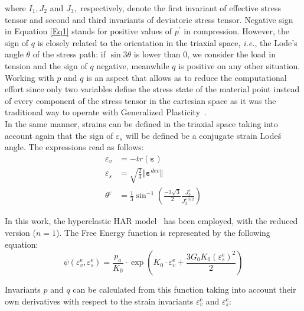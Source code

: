 \documentclass[preprint,12pt,a4paper]{elsarticle}
\begin{document}
where \(I_{1}, J_{2}\) and \(J_{3},\) respectively, denote the first invariant of effective stress tensor and second
and third invariants of deviatoric stress tensor. Negative sign in Equation \eqref{Eq1} stands for positive values of \(p^{\prime}\) in compression. However, the sign of $q$ is closely related to the orientation in the triaxial space, \textit{i.e.}, the Lode's angle $\theta$ of the stress path: if $\sin 3\theta$ is lower than 0, we consider the load in tension and the sign of $q$ negative, meanwhile $q$ is positive on any other situation. Working with $p$ and $q$ is an aspect that allows as to reduce the computational effort since only two variables define the stress state of the material point instead of every component of the stress tensor in the cartesian space as it was the traditional way to operate with Generalized Plasticity~\cite{Mira2009}.\\

In the same manner, strains can be defined in the triaxial space taking into account again that the sign of $\varepsilon_s$ will be defined be a conjugate strain Lode\'s angle. The expressions read as follows:
\begin{eqnarray}
\varepsilon_v &=- tr(\boldsymbol{\varepsilon})\label{Eq4}\\ 
\varepsilon_s &=\sqrt{\frac{2}{3}}\Vert \boldsymbol{\varepsilon}^{dev} \Vert \label{Eq5}\\ 
\theta^{\varepsilon} &=\frac{1}{3} \sin ^{-1}\left(\frac{-3 \sqrt{3}}{2} \frac{J^{\varepsilon}_{3}}{J_{2}^{\varepsilon \,3 / 2}}\right)\label{Eq6}
\end{eqnarray}

In this work, the hyperelastic HAR model~\cite{Houlsby2005} has been employed, with the reduced version ($n=1$). The Free Energy function is represented by the following equation:
\begin{equation}
\psi\left(\varepsilon_{v}^{\mathrm{e}}, \varepsilon_{s}^{\mathrm{e}}\right)=\frac{p_{a}}{K_0} \cdot \exp \left(K_0 \cdot \varepsilon_{v}^{\mathrm{e}}+\frac{3 G_0 K_0\left(\varepsilon_{s}^{\mathrm{e}}\right)^{2}}{2}\right)
\end{equation}

Invariants $p$ and $q$ can be calculated from this function taking into account their own derivatives with respect to the strain invariants $\varepsilon_{v}^{\mathrm{e}}$ and $\varepsilon_{s}^{\mathrm{e}}$:
\end{document}
